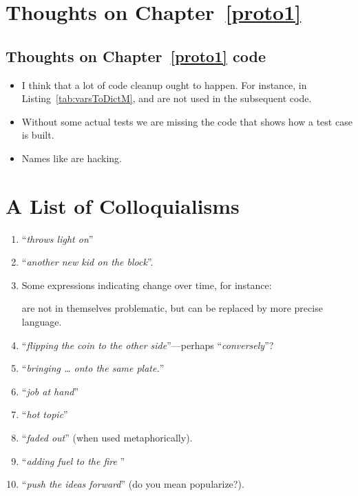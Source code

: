 \begin{scope}
\section{Thoughts on Chapter~\ref{proto1}}\label{sec:thoughts-chapt-proto1}

\subsection{Thoughts on Chapter~\ref{proto1}
  code}\label{sec:thoughts-chapt-proto1-code}

\begin{itemize}
\item I think that a lot of code cleanup ought to happen.  For instance, in
  Listing~\vref{tab:varsToDictM},  and
   are not used in the subsequent code.

\item 
  Without some actual tests we are missing the code that shows how a test
  case is built.

\item
  Names like  are hacking.
\end{itemize}


\section{A List of Colloquialisms}\label{sec:list-colloquialisms}
\begin{enumerate}
\item
  ``\textit{throws light on}''
\item
  ``\textit{another new kid on the block}''.
\item
  Some expressions indicating change over time, for instance:
  are not in themselves problematic, but can be replaced by
  more precise language.
\item
  ``\textit{flipping the coin to the other side}''---perhaps ``\textsl{conversely}''? 
\item 
  ``\textit{bringing \dots{} onto the same plate.}''
\item
  ``\textit{job at hand}''
\item
  ``\textit{hot topic}''
\item
  ``\textit{faded out}''  (when used metaphorically).
\item
  ``\textit{adding fuel to the fire }''
\item
  ``\textit{push the ideas forward}'' (do you mean popularize?).
\end{enumerate}

\end{scope}
